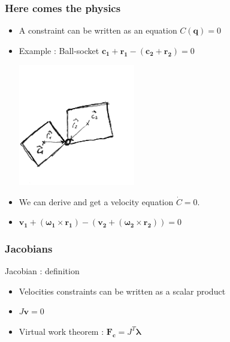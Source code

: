 \documentclass{beamer}
\begin{document}
\begin{frame}
 \frametitle{Here comes the physics}
 \begin{itemize}
  \item A constraint can be written as an equation $C(\mathbf{q}) = 0$
  \item Example : Ball-socket $\mathbf{c_1} + \mathbf{r_1} - (\mathbf{c_2} + \mathbf{r_2}) = 0$\\
  \begin{center}\includegraphics[width = 0.4\textwidth]{jacobian1.png}\end{center}
  \pause
  \item We can derive and get a velocity equation $\dot{C} = 0$.
  \item $\mathbf{v_1} + (\mathbf{\omega_1} \times \mathbf{r_1}) - ( \mathbf{v_2} + (\mathbf{\omega_2} \times \mathbf{r_2})) = 0$
  \end{itemize}
\end{frame}

\begin{frame}
 \frametitle{Jacobians}
 \begin{block}{Jacobian : definition}
 \begin{itemize}
  \item Velocities constraints can be written as a scalar product
  \item $J\mathbf{v} = 0$
  \pause
  \item Virtual work theorem : $\mathbf{F_c} = J^T \mathbf{\lambda}$
  \end{itemize}
  \end{block}
\end{frame}
\end{document}
